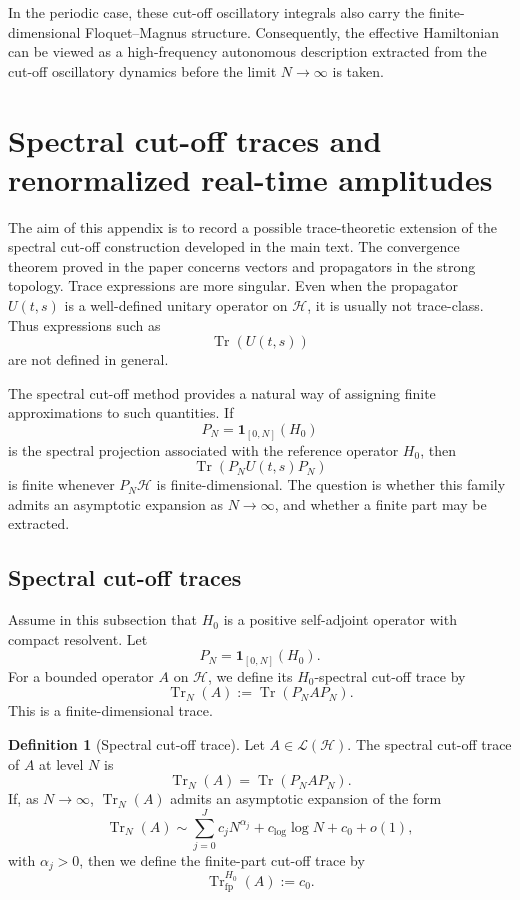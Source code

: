 \documentclass[11pt]{amsart}
\theoremstyle{plain}
\theoremstyle{definition}
\newtheorem{definition}[theorem]{Definition}
\theoremstyle{remark}
\newcommand{\Hilb}{\mathcal H}
\newcommand{\Tr}{\operatorname{Tr}}
\begin{document}
In the periodic case, these cut-off oscillatory integrals also carry
the finite-dimensional Floquet--Magnus structure.  Consequently, the
effective Hamiltonian can be viewed as a high-frequency autonomous
description extracted from the cut-off oscillatory dynamics before the
limit \(N\to\infty\) is taken.


\section{Spectral cut-off traces and renormalized real-time amplitudes}
\label{app:cutoff-traces}

The aim of this appendix is to record a possible trace-theoretic
extension of the spectral cut-off construction developed in the main
text.  The convergence theorem proved in the paper concerns vectors and
propagators in the strong topology.  Trace expressions are more
singular.  Even when the propagator \(U(t,s)\) is a well-defined unitary
operator on \(\Hilb\), it is usually not trace-class.  Thus expressions
such as
\[
        \Tr(U(t,s))
\]
are not defined in general.

The spectral cut-off method provides a natural way of assigning finite
approximations to such quantities.  If
\[
        P_N=\mathbf 1_{[0,N]}(H_0)
\]
is the spectral projection associated with the reference operator
\(H_0\), then
\[
        \Tr(P_NU(t,s)P_N)
\]
is finite whenever \(P_N\Hilb\) is finite-dimensional.  The question is
whether this family admits an asymptotic expansion as \(N\to\infty\),
and whether a finite part may be extracted.

\subsection{Spectral cut-off traces}

Assume in this subsection that \(H_0\) is a positive self-adjoint
operator with compact resolvent.  Let
\[
        P_N=\mathbf 1_{[0,N]}(H_0).
\]
For a bounded operator \(A\) on \(\Hilb\), we define its \(H_0\)-spectral
cut-off trace by
\[
        \Tr_N(A)
        :=
        \Tr(P_NAP_N).
\]
This is a finite-dimensional trace.

\begin{definition}[Spectral cut-off trace]
Let \(A\in\mathcal L(\Hilb)\).  The spectral cut-off trace of \(A\) at
level \(N\) is
\[
        \Tr_N(A)=\Tr(P_NAP_N).
\]
If, as \(N\to\infty\), \(\Tr_N(A)\) admits an asymptotic expansion of
the form
\[
        \Tr_N(A)
        \sim
        \sum_{j=0}^{J} c_j N^{\alpha_j}
        +
        c_{\log}\log N
        +
        c_0
        +
        o(1),
\]
with \(\alpha_j>0\), then we define the finite-part cut-off trace by
\[
        \Tr_{\mathrm{fp}}^{H_0}(A)
        :=
        c_0.
\]
\end{definition}
\end{document}
